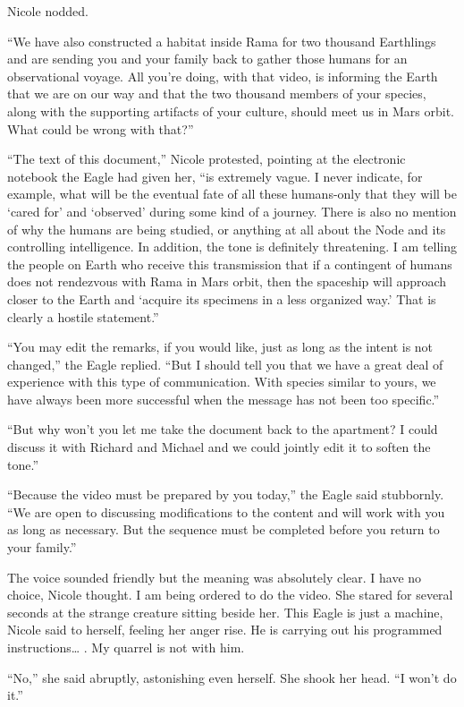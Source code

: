 \documentclass[]{article}
\begin{document}
{Nicole nodded.

“We have also constructed a habitat inside Rama for two thousand Earthlings and are sending you and your family back to gather those humans for an observational voyage.  All you’re doing, with that video, is informing the Earth that we are on our way and that the two thousand members of your species, along with the supporting artifacts of your culture, should meet us in Mars orbit.  What could be wrong with that?”

“The text of this document,” Nicole protested, pointing at the electronic notebook the Eagle had given her, “is extremely vague.  I never indicate, for example, what will be the eventual fate of all these humans-only that they will be ‘cared for’ and ‘observed’ during some kind of a journey.  There is also no mention of why the humans are being studied, or anything at all about the Node and its controlling intelligence.  In addition, the tone is definitely threatening.  I am telling the people on Earth who receive this transmission that if a contingent of humans does not rendezvous with Rama in Mars orbit, then the spaceship will approach closer to the Earth and ‘acquire its specimens in a less organized way.’ That is clearly a hostile statement.”

“You may edit the remarks, if you would like, just as long as the intent is not changed,” the Eagle replied.  “But I should tell you that we have a great deal of experience with this type of communication.  With species similar to yours, we have always been more successful when the message has not been too specific.”

“But why won’t you let me take the document back to the apartment? I could discuss it with Richard and Michael and we could jointly edit it to soften the tone.”

“Because the video must be prepared by you today,” the Eagle said stubbornly.  “We are open to discussing modifications to the content and will work with you as long as necessary.  But the sequence must be completed before you return to your family.”

The voice sounded friendly but the meaning was absolutely clear.  I have no choice, Nicole thought.  I am being ordered to do the video.  She stared for several seconds at the strange creature sitting beside her.  This Eagle is just a machine, Nicole said to herself, feeling her anger rise.  He is carrying out his programmed instructions… .  My quarrel is not with him.

“No,” she said abruptly, astonishing even herself.  She shook her head.  “I won’t do it.”

}
\end{document}
